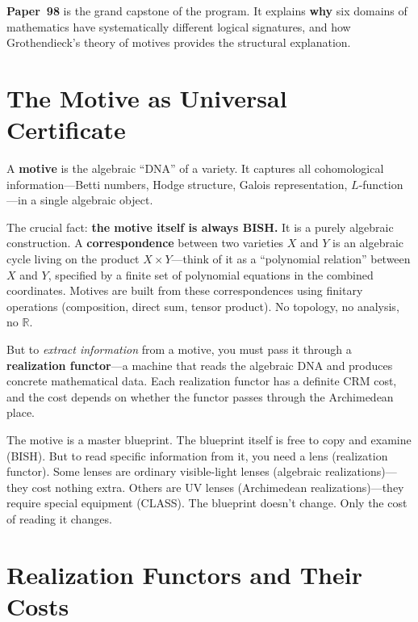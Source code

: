 \documentclass[11pt,twoside,openany]{report}
\theoremstyle{remark}
\newcommand{\BISH}{\textsf{BISH}}
\newcommand{\CLASS}{\textsf{CLASS}}
\newcommand{\paperref}[1]{\textbf{Paper~#1}}
\begin{document}
\paperref{98} is the grand capstone of the program. It explains \textbf{why} six domains of mathematics have systematically different logical signatures, and how Grothendieck's theory of motives provides the structural explanation.


\section{The Motive as Universal Certificate}

A \textbf{motive} is the algebraic ``DNA'' of a variety. It captures all cohomological information---Betti numbers, Hodge structure, Galois representation, $L$-function---in a single algebraic object.

The crucial fact: \textbf{the motive itself is always \BISH.} It is a purely algebraic construction. A \textbf{correspondence} between two varieties $X$ and $Y$ is an algebraic cycle living on the product $X \times Y$---think of it as a ``polynomial relation'' between $X$ and $Y$, specified by a finite set of polynomial equations in the combined coordinates. Motives are built from these correspondences using finitary operations (composition, direct sum, tensor product). No topology, no analysis, no $\mathbb{R}$.

But to \emph{extract information} from a motive, you must pass it through a \textbf{realization functor}---a machine that reads the algebraic DNA and produces concrete mathematical data. Each realization functor has a definite CRM cost, and the cost depends on whether the functor passes through the Archimedean place.

\begin{analogybox}
The motive is a master blueprint. The blueprint itself is free to copy and examine (\BISH). But to read specific information from it, you need a lens (realization functor). Some lenses are ordinary visible-light lenses (algebraic realizations)---they cost nothing extra. Others are UV lenses (Archimedean realizations)---they require special equipment (\CLASS). The blueprint doesn't change. Only the cost of reading it changes.
\end{analogybox}


\section{Realization Functors and Their Costs}
\end{document}
